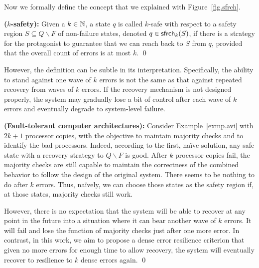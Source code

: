 Now we formally define the concept that we explained with Figure~\ref{fig.sfrch}.  

\begin{definition}{\bf ($k$-safety):} 
\label{k-safe}
Given a $k\in{\mathbb N}$, 
a state $q$ is called \mbox{$k$-safe} with respect to 
a safety region $S\subseteq Q\smallsetminus F$ of non-failure states, 
denoted $q\in\mathsf{sfrch}_k(S)$, if there 
is a strategy for the protagonist to guarantee that 
we can reach back to $S$ from $q$, provided that
the overall count of errors is at most $k$.
\qed 
\end{definition}

However, the definition can be subtle in its interpretation.  
Specifically, the ability to stand against one wave of $k$ errors 
is not the same as that against repeated recovery 
from waves of $k$ errors.  
If the recovery mechanism is not designed properly, 
the system may gradually lose a bit of control after each wave of $k$ errors 
and eventually degrade to system-level failure. 

\begin{example} 
{\bf (Fault-tolerant computer architectures):}  
Consider Example~\ref{exmp.avi} with $2k+1$ processor copies, with the objective to maintain majority checks and to identify the bad processors. 
Indeed, according to the first, na\"ive solution, any safe state with a recovery strategy to $Q\smallsetminus F$ is good.   
After $k$ processor copies fail, the majority checks are still capable to maintain the correctness of the combined behavior to follow the design of the original system.
There seems to be nothing to do after $k$ errors.  
Thus, na\"ively, we can choose those states as the safety region if, at those states, majority checks still work.

However, there is no expectation that the system will be able
to recover at any point in the future into a situation where it can bear 
another wave of $k$ errors.   
It will fail and lose the function of majority checks just after one more error.  
In contrast, in this work, we aim to propose a dense error resilience criterion that 
given no more errors for enough time to allow recovery, 
the system will eventually recover to resilience to $k$ dense errors again. 
\qed 
\end{example} 

